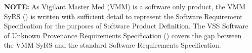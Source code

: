 \textbf{NOTE:} As Vigilant Master Med (VMM) is a software only product, the VMM
SyRS (\vssmSyRS) is written with sufficient detail to represent the Software
Requirement Specification for the purposes of Software Product Definition.  The
VSS Software of Unknown Provenance Requirements Specification (\vssSOUP) covers
the gap between the VMM SyRS and the standard Software Requirements
Specification.

\tlcVspace
